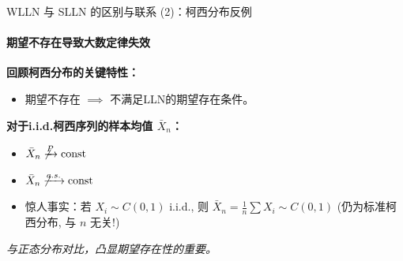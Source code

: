 \documentclass[UTF8]{beamer}
\begin{document}
\begin{frame}[shrink=5]{WLLN 与 SLLN 的区别与联系 (2)：柯西分布反例}
    \framesubtitle{期望不存在导致大数定律失效}
    \textbf{回顾柯西分布的关键特性：}
     \begin{itemize}
        \item 期望\alert{不存在} $\implies$ 不满足LLN的期望存在条件。
    \end{itemize}
    \pause
    \textbf{对于i.i.d.柯西序列的样本均值 $\bar{X}_n$：}
    \begin{itemize}
        \item $\bar{X}_n \not\xrightarrow{P} \text{const}$
        \item $\bar{X}_n \not\xrightarrow{a.s.} \text{const}$
        \item \alert{惊人事实}：若 $X_i \sim C(0,1)$ i.i.d., 则 $\bar{X}_n = \frac{1}{n} \sum X_i \sim C(0,1)$ (\alert{仍为标准柯西分布}, 与 $n$ 无关!)
    \end{itemize}
    \vspace{0.3cm}
    \textit{与正态分布对比，凸显期望存在性的重要。}
\end{frame}
\end{document}
